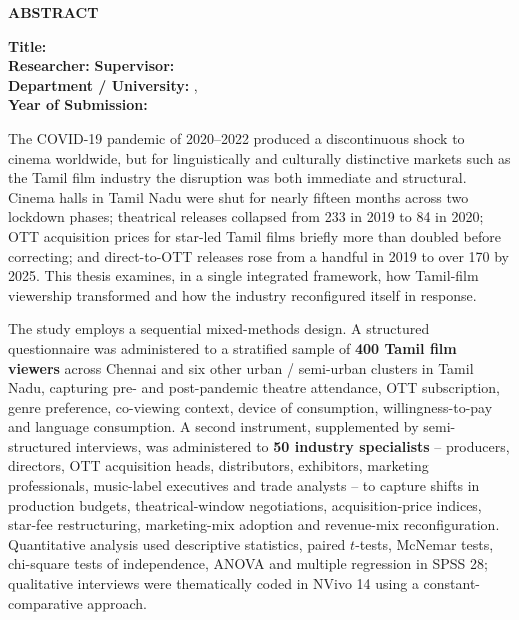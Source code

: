 \thispagestyle{empty}
\begin{center}
{\large \bfseries ABSTRACT}
\end{center}
\vspace{0.4cm}

\noindent
\textbf{Title:} \thesistitle\\
\textbf{Researcher:} \researcher \quad \textbf{Supervisor:} \supervisor\\
\textbf{Department / University:} \department, \institution\\
\textbf{Year of Submission:} \submissionyear

\bigskip
\noindent
The COVID-19 pandemic of 2020--2022 produced a discontinuous shock to
cinema worldwide, but for linguistically and culturally distinctive
markets such as the Tamil film industry the disruption was both
immediate and structural.  Cinema halls in Tamil Nadu were shut for
nearly fifteen months across two lockdown phases; theatrical releases
collapsed from 233 in 2019 to 84 in 2020; OTT acquisition prices for
star-led Tamil films briefly more than doubled before correcting; and
direct-to-OTT releases rose from a handful in 2019 to over 170 by 2025.
This thesis examines, in a single integrated framework, how Tamil-film
viewership transformed and how the industry reconfigured itself in
response.

\medskip
\noindent
The study employs a sequential mixed-methods design.  A structured
questionnaire was administered to a stratified sample of \textbf{400
Tamil film viewers} across Chennai and six other urban / semi-urban
clusters in Tamil Nadu, capturing pre- and post-pandemic theatre
attendance, OTT subscription, genre preference, co-viewing context,
device of consumption, willingness-to-pay and language consumption.
A second instrument, supplemented by semi-structured interviews, was
administered to \textbf{50 industry specialists} -- producers,
directors, OTT acquisition heads, distributors, exhibitors, marketing
professionals, music-label executives and trade analysts -- to capture
shifts in production budgets, theatrical-window negotiations,
acquisition-price indices, star-fee restructuring, marketing-mix
adoption and revenue-mix reconfiguration.  Quantitative analysis used
descriptive statistics, paired $t$-tests, McNemar tests, chi-square
tests of independence, ANOVA and multiple regression in SPSS 28;
qualitative interviews were thematically coded in NVivo 14 using a
constant-comparative approach.

